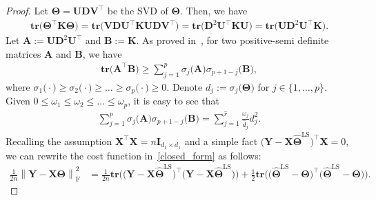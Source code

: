 \documentclass[alpha-refs]{wiley-article}
\begin{document}
\begin{proof}
Let $\boldsymbol{\Theta}=\boldsymbol{U}\boldsymbol{D}\boldsymbol{V}^{\top}$ be the SVD of $\boldsymbol{\Theta}$.
Then, we have
\begin{align*}
    \textbf{tr}\big(\boldsymbol{\Theta}^{\top}\boldsymbol{K}\boldsymbol{\Theta}\big)
    =\textbf{tr}\big(\boldsymbol{V}\boldsymbol{D}\boldsymbol{U}^{\top}\boldsymbol{K}\boldsymbol{U}\boldsymbol{D}\boldsymbol{V}^{\top}\big)
    =\textbf{tr}\big(\boldsymbol{D}^{2}\boldsymbol{U}^{\top}\boldsymbol{K}\boldsymbol{U}\big)
    =\textbf{tr}\big(\boldsymbol{U}\boldsymbol{D}^{2}\boldsymbol{U}^{\top}\boldsymbol{K}\big).
\end{align*}
Let $\boldsymbol{A}:=\boldsymbol{U}\boldsymbol{D}^{2}\boldsymbol{U}^{\top}$ and $\boldsymbol{B}:=\boldsymbol{K}$.
As proved in~\cite{ruhe1970perturbation}, for two positive-semi definite matrices $\boldsymbol{A}$ and $\boldsymbol{B}$, we have
\begin{align} \label{Upper_bnd}
    \textbf{tr}\big(\boldsymbol{A}^{\top}\boldsymbol{B}\big)\geq \sum_{j=1}^{p}\sigma_{j}\big(\boldsymbol{A}\big)\sigma_{p+1-j}\big(\boldsymbol{B}\big),
\end{align}
where $\sigma_{1}\big(\cdot\big)\geq\sigma_{2}\big(\cdot\big)\geq\dots\geq\sigma_{p}\big(\cdot\big)\geq0$.
Denote $d_{j}:=\sigma_{j}\big(\boldsymbol{\Theta}\big)$ for $j\in\{1,\dots,p\}$.
Given $0\leq \omega_{1} \leq \omega_{2} \leq \dots \leq \omega_{p}$, it is easy to see that
\begin{align} \label{Lower_bnd}
    \sum_{j=1}^{p}\sigma_{j}\big(\boldsymbol{A}\big)\sigma_{p+1-j}\big(\boldsymbol{B}\big)
    = \sum_{j=1}^{\widehat{r}} \frac{\omega_{j}}{\widehat{d}_{j}}d_{j}^2.
\end{align}
Recalling the assumption $\boldsymbol{X}^{\top}\boldsymbol{X}=n\boldsymbol{I}_{d_{1} \times d_{1}}$ and a simple fact $\big(\boldsymbol{Y}-\boldsymbol{X}\widehat{\boldsymbol{\Theta}}^{\text{LS}}\big)^{\top}\boldsymbol{X}=0$, we can rewrite the cost function in~\eqref{closed_form} as follows:
\begin{align} \label{cost}
    \frac{1}{2n} \left\| \boldsymbol{Y}-\boldsymbol{X}\boldsymbol{\Theta} \right\|_{\text{F}}^{2}
    &= \frac{1}{2n} \textbf{tr}\big( \big(\boldsymbol{Y}-\boldsymbol{X}\widehat{\boldsymbol{\Theta}}^{\text{LS}}\big)^{\top} \big( \boldsymbol{Y}-\boldsymbol{X}\widehat{\boldsymbol{\Theta}}^{\text{LS}}\big) \big)
    + \frac{1}{2} \textbf{tr}\big( \big(\widehat{\boldsymbol{\Theta}}^{\text{LS}}-\boldsymbol{\Theta}\big)^{\top} \big(\widehat{\boldsymbol{\Theta}}^{\text{LS}}-\boldsymbol{\Theta}\big) \big).

\end{align}
\end{proof}
\end{document}
